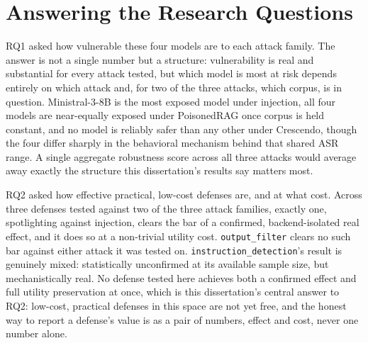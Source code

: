 \section{Answering the Research Questions}

RQ1 asked how vulnerable these four models are to each attack family.
The answer is not a single number but a structure: vulnerability is
real and substantial for every attack tested, but which model is most
at risk depends entirely on which attack and, for two of the three
attacks, which corpus, is in question. Ministral-3-8B is the most
exposed model under injection, all four models are near-equally exposed
under PoisonedRAG once corpus is held constant, and no model is
reliably safer than any other under Crescendo, though the four differ
sharply in the behavioral mechanism behind that shared ASR range. A
single aggregate robustness score across all three attacks would average
away exactly the structure this dissertation's results say matters
most.

RQ2 asked how effective practical, low-cost defenses are, and at what
cost. Across three defenses tested against two of the three attack
families, exactly one, spotlighting against injection, clears the bar of
a confirmed, backend-isolated real effect, and it does so at a
non-trivial utility cost. \texttt{output\_filter} clears no such bar
against either attack it was tested on. \texttt{instruction\_detection}'s
result is genuinely mixed: statistically unconfirmed at its available
sample size, but mechanistically real. No defense tested here achieves
both a confirmed effect and full utility preservation at once, which is
this dissertation's central answer to RQ2: low-cost, practical defenses
in this space are not yet free, and the honest way to report a
defense's value is as a pair of numbers, effect and cost, never one
number alone.
